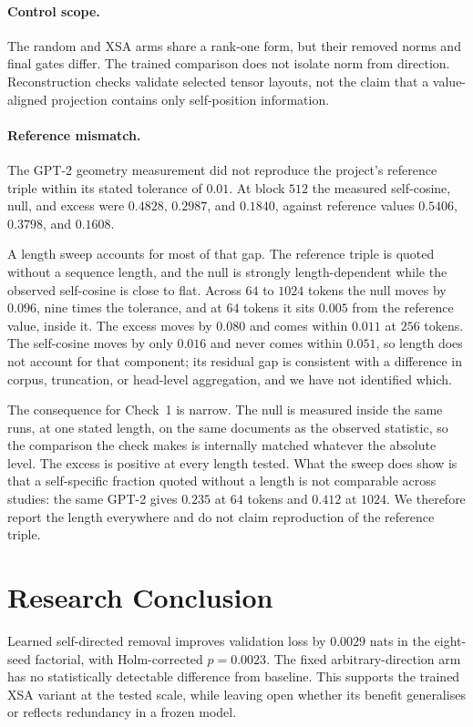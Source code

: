 \documentclass{article} %
\begin{document}
\paragraph{Control scope.} The random and XSA arms share a rank-one form,
but their removed norms and final gates differ. The trained comparison does
not isolate norm from direction. Reconstruction checks validate selected
tensor layouts, not the claim that a value-aligned projection contains only
self-position information.

\paragraph{Reference mismatch.} The GPT-2 geometry measurement did not
reproduce the project's reference triple within its stated tolerance of
$0.01$. At block $512$ the measured self-cosine, null, and excess were
$0.4828$, $0.2987$, and $0.1840$, against reference values $0.5406$,
$0.3798$, and $0.1608$.

A length sweep accounts for most of that gap. The reference triple is quoted
without a sequence length, and the null is strongly length-dependent while the
observed self-cosine is close to flat. Across $64$ to $1024$ tokens the null
moves by $0.096$, nine times the tolerance, and at $64$ tokens it sits $0.005$
from the reference value, inside it. The excess moves by $0.080$ and comes
within $0.011$ at $256$ tokens. The self-cosine moves by only $0.016$ and
never comes within $0.051$, so length does not account for that component; its
residual gap is consistent with a difference in corpus, truncation, or
head-level aggregation, and we have not identified which.

The consequence for Check~1 is narrow. The null is measured inside the same
runs, at one stated length, on the same documents as the observed statistic,
so the comparison the check makes is internally matched whatever the absolute
level. The excess is positive at every length tested. What the sweep does show
is that a self-specific fraction quoted without a length is not comparable
across studies: the same GPT-2 gives $0.235$ at $64$ tokens and $0.412$ at
$1024$. We therefore report the length everywhere and do not claim
reproduction of the reference triple.

\section{Research Conclusion}

Learned self-directed removal improves validation loss by $0.0029$ nats in
the eight-seed factorial, with Holm-corrected $p = 0.0023$. The fixed
arbitrary-direction arm has no statistically detectable difference from
baseline. This supports the trained XSA variant at the tested scale, while
leaving open whether its benefit generalises or reflects redundancy in a
frozen model.
\end{document}
